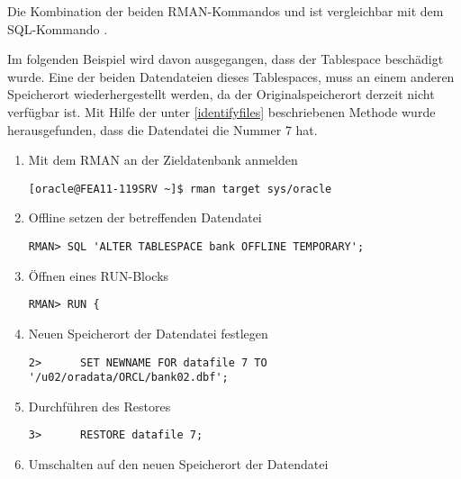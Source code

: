           Die Kombination der beiden RMAN-Kommandos  und  ist vergleichbar mit dem SQL-Kommando .

          Im folgenden Beispiel wird davon ausgegangen, dass der Tablespace  besch\"adigt wurde. Eine der beiden Datendateien dieses Tablespaces, muss an einem anderen Speicherort wiederhergestellt werden, da der Originalspeicherort derzeit nicht verf\"ugbar ist. Mit Hilfe der unter \ref{identifyfiles} beschriebenen Methode wurde herausgefunden, dass die Datendatei  die Nummer 7 hat.
          \begin{enumerate}
            \item Mit dem RMAN an der Zieldatenbank anmelden
              \begin{lstlisting}[caption={An der Zieldatenbank anmelden},label=admin1479,language=rman]
[oracle@FEA11-119SRV ~]$ rman target sys/oracle
              \end{lstlisting}
            \item Offline setzen der betreffenden Datendatei
              \begin{lstlisting}[caption={Betreffende Datendatei Offline setzen},label=admin1480,language=rman,emph={[9]ALTER,TABLESPACE,OFFLINE,TEMPORARY},emphstyle={[9]\color{magenta}\bfseries}]
RMAN> SQL 'ALTER TABLESPACE bank OFFLINE TEMPORARY';
              \end{lstlisting}
            \item \"Offnen eines RUN-Blocks
            \begin{lstlisting}[caption={Einen RUN-Block \"offnen},label=admin1481,language=rman]
RMAN> RUN {
            \end{lstlisting}
            \item Neuen Speicherort der Datendatei festlegen
            \begin{lstlisting}[caption={Neuen Speicherort festlegen},label=admin1482,language=rman]
2>      SET NEWNAME FOR datafile 7 TO '/u02/oradata/ORCL/bank02.dbf';
            \end{lstlisting}
            \item Durchf\"uhren des Restores
            \begin{lstlisting}[caption={Restore durchf\"uhren},label=admin1483,language=rman]
3>      RESTORE datafile 7;
            \end{lstlisting}
            \item Umschalten auf den neuen Speicherort der Datendatei

\end{enumerate}
